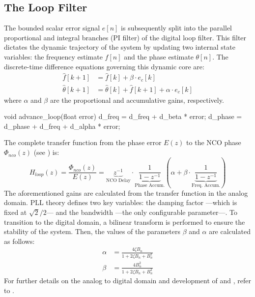 \subsection{The Loop Filter}

The bounded scalar error signal $e[n]$ is subsequently split into the parallel proportional and integral branches (PI filter) of the digital loop filter. This filter dictates the dynamic trajectory of the system by updating two internal state variables: the frequency estimate $f[n]$ and the phase estimate $\theta[n]$. The discrete-time difference equations governing this dynamic core are:
\begin{align}
    \hat{f}[k+1] &= \hat{f}[k] + \beta \cdot e_c[k] \label{eq:integral_branch} \\
    \hat{\theta}[k+1] &= \hat{\theta}[k] + \hat{f}[k+1] + \alpha \cdot e_c[k] \label{eq:prop_branch}
\end{align}
where $\alpha$ and $\beta$ are the proportional and accumulative gains, respectively.
\begin{cpp}
void advance_loop(float error)
{
    d_freq = d_freq + d_beta * error;
    d_phase = d_phase + d_freq + d_alpha * error;
}
\end{cpp}\vspace{-2.25mm}

The complete transfer function from the phase error $E(z)$ to the NCO phase $\Phi_{nco}(z)$ (see ) is:
\begin{equation} \label{eq:transfer_function}
    H_{loop}(z) = \frac{\Phi_{nco}(z)}{E(z)} = \underbrace{z^{-1}}_{\text{NCO Delay}} \cdot \underbrace{\frac{1}{1-z^{-1}}}_{\text{Phase Accum.}} \left( \alpha + \beta \cdot \underbrace{\frac{1}{1-z^{-1}}}_{\text{Freq. Accum.}} \right)
\end{equation}
The aforementioned gains are calculated from the transfer function in the analog domain. PLL theory defines two key variables: the damping factor ---which is fixed at $\sqrt{2}/2$--- and the bandwidth ---the only configurable parameter---. To transition to the digital domain, a bilinear transform is performed to ensure the stability of the system. Then, the values of the parameters $\beta$ and $\alpha$ are calculated as follows:
\begin{align}
    \alpha &= \frac{4\zeta B_{n}}{1 + 2\zeta B_{n} + B_{n}^2} \label{eq:alpha} \\
    \beta &= \frac{4B_{n}^2}{1 + 2\zeta B_{n} + B_{n}^2} \label{eq:beta}
\end{align}
For further details on the analog to digital domain and development of  and , refer to \autocite[Chapters 2 \& 13]{gardner2005}.





